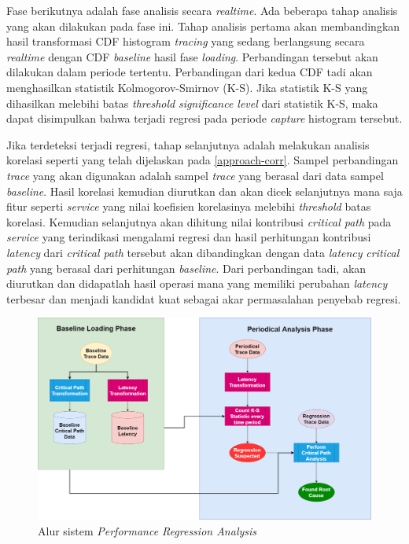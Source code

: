 Fase berikutnya adalah fase analisis secara \textit{realtime}. Ada beberapa tahap analisis yang akan dilakukan pada fase ini.  Tahap analisis pertama akan membandingkan hasil transformasi CDF histogram \textit{tracing} yang sedang berlangsung secara \textit{realtime} dengan CDF \textit{baseline} hasil fase \textit{loading}. Perbandingan tersebut akan dilakukan dalam periode tertentu. Perbandingan dari kedua CDF tadi akan menghasilkan statistik Kolmogorov-Smirnov (K-S). Jika statistik K-S yang dihasilkan melebihi batas \textit{threshold} \textit{significance level} dari statistik K-S, maka dapat disimpulkan bahwa terjadi regresi pada periode \textit{capture} histogram tersebut. 

Jika terdeteksi terjadi regresi, tahap selanjutnya adalah melakukan analisis korelasi seperti yang telah dijelaskan pada \ref{approach-corr}. Sampel perbandingan \textit{trace} yang akan digunakan adalah sampel \textit{trace} yang berasal dari data sampel \textit{baseline}. Hasil korelasi kemudian diurutkan dan akan dicek selanjutnya mana saja fitur seperti \textit{service} yang nilai koefisien korelasinya melebihi \textit{threshold} batas korelasi. Kemudian selanjutnya akan dihitung nilai kontribusi \textit{critical path} pada \textit{service} yang terindikasi mengalami regresi dan hasil perhitungan kontribusi \textit{latency} dari \textit{critical path} tersebut akan dibandingkan dengan data \textit{latency} \textit{critical path} yang berasal dari perhitungan \textit{baseline}. Dari perbandingan tadi, akan diurutkan dan didapatlah hasil operasi mana yang memiliki perubahan \textit{latency} terbesar dan menjadi kandidat kuat sebagai akar permasalahan penyebab regresi.

\begin{figure}[!htb]
	\centering
	\includegraphics[width=1.2\textwidth]{resources/ch3/alur_v2.png}
	\caption{Alur sistem \textit{Performance Regression Analysis}}
	\label{alur-pra}
\end{figure}

